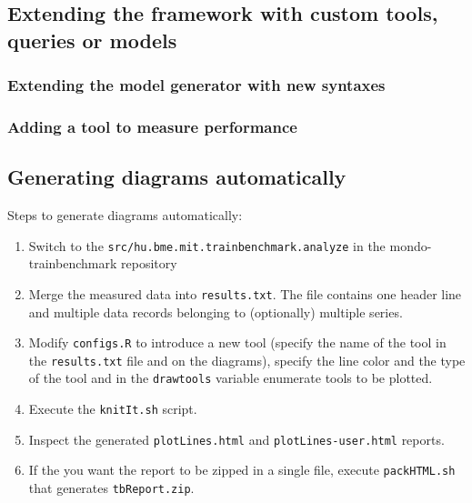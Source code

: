 \subsection{Extending the framework with custom tools, queries or models}
\subsubsection{Extending the model generator with new syntaxes}
\subsubsection{Adding a tool to measure performance}

\subsection{Generating diagrams automatically}

Steps to generate diagrams automatically:
\begin{enumerate}
  \item Switch to the \texttt{src/hu.bme.mit.trainbenchmark.analyze} in the mondo-trainbenchmark repository
  \item Merge the measured data into \texttt{results.txt}. The file contains one header line and multiple data records belonging to (optionally) multiple series.
  \item Modify \texttt{configs.R} to introduce a new tool (specify the name of the tool in the \texttt{results.txt} file and on the diagrams), specify the line color and the type of the tool and in the \texttt{drawtools} variable enumerate tools to be plotted.
  \item Execute the \texttt{knitIt.sh} script.
  \item Inspect the generated \texttt{plotLines.html} and \texttt{plotLines-user.html} reports.
  \item If the you want the report to be zipped in a single file, execute \texttt{packHTML.sh} that generates \texttt{tbReport.zip}.
\end{enumerate}
